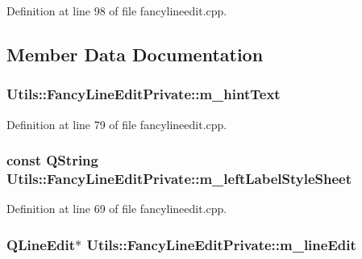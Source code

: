 \-Definition at line 98 of file fancylineedit.\-cpp.



\subsection{\-Member \-Data \-Documentation}
\hypertarget{class_utils_1_1_fancy_line_edit_private_a9c00e4643180c89143ef729c7704e8e7}{
\subsubsection[{m\-\_\-hint\-Text}]{ {\bf \-Utils\-::\-Fancy\-Line\-Edit\-Private\-::m\-\_\-hint\-Text}}}\label{class_utils_1_1_fancy_line_edit_private_a9c00e4643180c89143ef729c7704e8e7}


\-Definition at line 79 of file fancylineedit.\-cpp.

\hypertarget{class_utils_1_1_fancy_line_edit_private_ac6b25312f607b9026eb121613299c779}{
\subsubsection[{m\-\_\-left\-Label\-Style\-Sheet}]{\setlength{\rightskip}{0pt plus 5cm}const {\bf \-Q\-String} {\bf \-Utils\-::\-Fancy\-Line\-Edit\-Private\-::m\-\_\-left\-Label\-Style\-Sheet}}}\label{class_utils_1_1_fancy_line_edit_private_ac6b25312f607b9026eb121613299c779}


\-Definition at line 69 of file fancylineedit.\-cpp.

\hypertarget{class_utils_1_1_fancy_line_edit_private_aa5c668f49cf8d8e523dd5aa4a8f08e3d}{
\subsubsection[{m\-\_\-line\-Edit}]{\setlength{\rightskip}{0pt plus 5cm}\-Q\-Line\-Edit$\ast$ {\bf \-Utils\-::\-Fancy\-Line\-Edit\-Private\-::m\-\_\-line\-Edit}}}\label{class_utils_1_1_fancy_line_edit_private_aa5c668f49cf8d8e523dd5aa4a8f08e3d}


